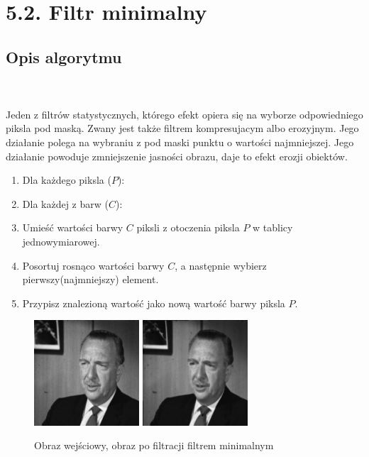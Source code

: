 \documentclass[final,a4paper,openany,12pt]{mwbk}
\begin{document}
\newpage
\section*{5.2. Filtr minimalny}
\subsection*{Opis algorytmu}
\hfill
\\\\
\indent  Jeden z filtrów statystycznych, którego efekt opiera się na wyborze odpowiedniego piksla pod maską. Zwany jest także filtrem kompresujacym albo erozyjnym. Jego działanie polega na wybraniu z pod maski punktu o wartości najmniejszej. Jego działanie powoduje zmniejszenie jasności obrazu,  daje to efekt erozji obiektów. 

\begin{enumerate}
	\item Dla każdego piksla ($P$):
	\item Dla każdej z barw ($C$):
	\item Umieść wartości barwy $C$ piksli z otoczenia piksla $P$ w tablicy jednowymiarowej.
	\item Posortuj rosnąco wartości barwy $C$, a następnie wybierz pierwszy(najmniejszy) element.
	\item Przypisz znalezioną wartość jako nową wartość barwy piksla $P$.
\end{enumerate}

\begin{figure}[H]
	\begin{center}
		\includegraphics[width=0.35\textwidth]{gentelman_gray}
		\includegraphics[width=0.35\textwidth]{gentelman_gray_min_result}
	\end{center}
	\caption{Obraz wejściowy, obraz po filtracji filtrem minimalnym}
\end{figure}
\end{document}
